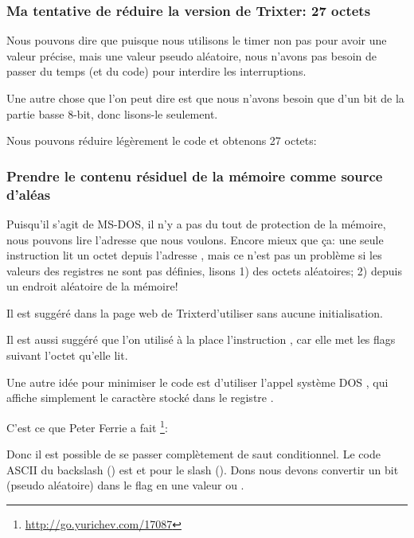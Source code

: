\subsubsection{
Ma tentative de réduire la version de Trixter: 27 octets}

Nous pouvons dire que puisque nous utilisons le timer non pas pour avoir une valeur
précise, mais une valeur pseudo aléatoire, nous n'avons pas besoin de passer du temps
(et du code) pour interdire les interruptions.

Une autre chose que l'on peut dire est que nous n'avons besoin que d'un bit de la
partie basse 8-bit, donc lisons-le seulement.

Nous pouvons réduire légèrement le code et obtenons 27 octets:



\subsubsection{
Prendre le contenu résiduel de la mémoire comme source d'aléas}

Puisqu'il s'agit de MS-DOS, il n'y a pas du tout de protection de la mémoire, nous
pouvons lire l'adresse que nous voulons.
Encore mieux que ça: une seule instruction  lit un octet depuis l'adresse
, mais ce n'est pas un problème si les valeurs des registres ne sont pas
définies, lisons 1) des octets aléatoires; 2) depuis un endroit aléatoire de la mémoire! 

Il est suggéré dans la page web de Trixter\FNURLTRIXTER d'utiliser  sans
aucune initialisation.

Il est aussi suggéré que l'on utilisé à la place l'instruction , car elle
met les flags suivant l'octet qu'elle lit.

Une autre idée pour minimiser le code est d'utiliser l'appel système DOS ,
qui affiche simplement le caractère stocké dans le registre .

C'est ce que Peter Ferrie a fait
\footnote{\url{http://go.yurichev.com/17087}}:



Donc il est possible de se passer complètement de saut conditionnel.
Le code \ac{ASCII} du backslash (\q{\textbackslash{}}) est  et 
pour le slash (\q{/}).
Dons nous devons convertir un bit (pseudo aléatoire) dans le flag  en une
valeur  ou .

